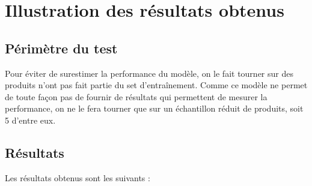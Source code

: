         \section{Illustration des résultats obtenus}
    
            \subsection{Périmètre du test}
            
            Pour éviter de surestimer la performance du modèle, on le fait tourner sur des produits n'ont pas fait partie du set d'entraînement.            
            Comme ce modèle ne permet de toute façon pas de fournir de résultats qui permettent de mesurer la performance, on ne le fera tourner que sur un échantillon réduit de produits, soit 5 d'entre eux.

            \subsection{Résultats}

            Les résultats obtenus sont les suivants :


